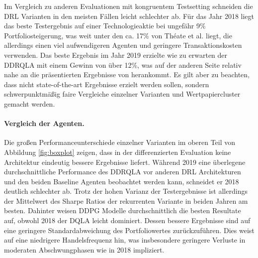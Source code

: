 Im Vergleich zu anderen Evaluationen mit kongruentem Testsetting schneiden die \acs{DRL} Varianten in den meisten Fällen leicht schlechter ab.
Für das Jahr 2018 liegt das beste Testergebnis auf einer Technologieaktie bei ungefähr 9\% Portfoliosteigerung, was weit unter den ca. 17\% von Théate et al. \parencite{théate2020application} liegt, die allerdings einen viel aufwendigeren Agenten und geringere Transaktionskosten verwenden.
Das beste Ergebnis im Jahr 2019 erzielte wie zu erwarten der \acs{DDRQLA} mit einem Gewinn von über 12\%, was auf der anderen Seite relativ nahe an die präsentierten Ergebnisse von \parencite{zhang2019deep,duel} herankommt.
Es gilt aber zu beachten, dass nicht state-of-the-art Ergebnisse erzielt werden sollen, sondern schwerpunktmäßig faire Vergleiche einzelner Varianten und Wertpapiercluster gemacht werden.

\paragraph{Vergleich der Agenten.}
Die großen Performanceunterschiede einzelner Varianten im oberen Teil von Abbildung \ref{fig:boxplot} zeigen, dass in der differenzierten Evaluation keine Architektur eindeutig bessere Ergebnisse liefert.
Während 2019 eine überlegene durchschnittliche Performance des \acs{DDRQLA} vor anderen \acs{DRL} Architekturen und den beiden Baseline Agenten beobachtet werden kann, schneidet er 2018 deutlich schlechter ab.
Trotz der hohen Varianz der Testergebnisse ist allerdings der Mittelwert des Sharpe Ratios der rekurrenten Variante in beiden Jahren am besten.
Dahinter weisen \acs{DDPG} Modelle durchschnittlich die besten Resultate auf, obwohl 2018 der \acs{DQLA} leicht dominiert. Dessen bessere Ergebnisse sind auf eine geringere Standardabweichung des Portfoliowertes zurückzuführen. Dies weist auf eine niedrigere Handelsfrequenz hin, was insbesondere geringere Verluste in moderaten Abschwungphasen wie in 2018 impliziert.

